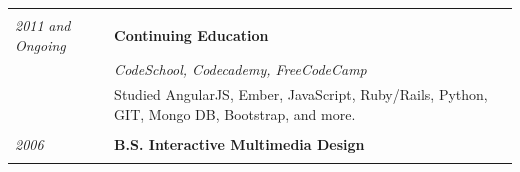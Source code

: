 \documentclass[]{article}
\begin{document}
\begin{multicols}{2}
\begin{longtable}[c]{@{}ll@{}}
\toprule
\begin{minipage}[t]{0.20\columnwidth}\raggedright\strut
\strut\end{minipage} &
\begin{minipage}[t]{0.74\columnwidth}\raggedright\strut
\strut\end{minipage}\tabularnewline
\begin{minipage}[t]{0.20\columnwidth}\raggedright\strut
\color{grey} \emph{2011} \emph{and Ongoing}
\strut\end{minipage} &
\begin{minipage}[t]{0.74\columnwidth}\raggedright\strut
\textbf{Continuing Education}
\strut\end{minipage}\tabularnewline
\begin{minipage}[t]{0.20\columnwidth}\raggedright\strut
\strut\end{minipage} &
\begin{minipage}[t]{0.74\columnwidth}\raggedright\strut
\emph{CodeSchool, Codecademy, FreeCodeCamp}
\strut\end{minipage}\tabularnewline
\begin{minipage}[t]{0.20\columnwidth}\raggedright\strut
\strut\end{minipage} &
\begin{minipage}[t]{0.74\columnwidth}\raggedright\strut
\color{grey} Studied AngularJS, Ember, JavaScript, Ruby/Rails, Python,
GIT, Mongo DB, Bootstrap, and more.
\strut\end{minipage}\tabularnewline
\begin{minipage}[t]{0.20\columnwidth}\raggedright\strut
\strut\end{minipage} &
\begin{minipage}[t]{0.74\columnwidth}\raggedright\strut
\strut\end{minipage}\tabularnewline
\begin{minipage}[t]{0.20\columnwidth}\raggedright\strut
\color{grey} \emph{2006}
\strut\end{minipage} &
\begin{minipage}[t]{0.74\columnwidth}\raggedright\strut
\textbf{B.S. Interactive Multimedia Design}
\strut\end{minipage}\tabularnewline
\begin{minipage}[t]{0.20\columnwidth}\raggedright\strut
\strut\end{minipage} &
\begin{minipage}[t]{0.74\columnwidth}\raggedright\strut

\end{minipage}
\end{longtable}
\end{multicols}
\end{document}
